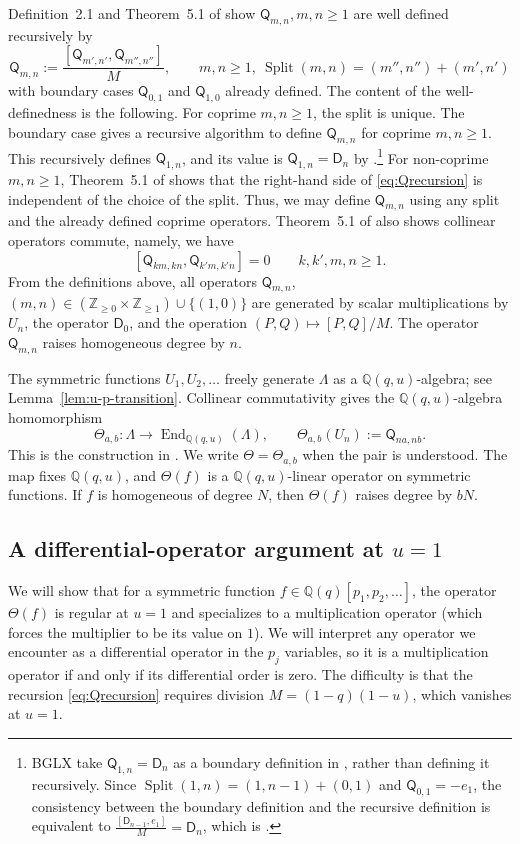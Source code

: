 \documentclass[12pt,reqno]{amsart}
\numberwithin{equation}{section}
\theoremstyle{definition}
\theoremstyle{remark}
\theoremstyle{plain}
\newcommand{\NN}{\mathbb Z_{\ge0}}
\newcommand{\ZZ}{\mathbb Z}
\newcommand{\QQ}{\mathbb Q}
\newcommand{\Qop}{\mathsf Q}
\newcommand{\Dop}{\mathsf D}
\begin{document}
Definition~2.1 and Theorem~5.1 of \cite{BGLX} show $\Qop_{m,n}, m,n\ge 1$ are well defined recursively by
\begin{equation}\label{eq:Qrecursion}
 \Qop_{m,n}:=\frac{[\Qop_{m',n'},\Qop_{m'',n''}]}{M}
       , \qquad m,n\ge 1,\ \operatorname{Split}(m,n)=(m'',n'')+(m',n')
\end{equation}
with boundary cases $\Qop_{0,1}$ and $\Qop_{1,0}$ already defined. The content of the well-definedness is the following. For coprime $m,n\ge 1$, the split is unique. The boundary case gives a recursive algorithm to define $\Qop_{m,n}$ for coprime $m,n\geq 1$. This recursively defines $\Qop_{1,n}$, and its value is $\Qop_{1,n}=\Dop_n$ by \cite[(4.9)(ii)]{BGLX}.\footnote{BGLX take $\Qop_{1,n}=\Dop_n$ as a boundary definition in \cite[(2.5) and Definition~2.1]{BGLX}, rather than defining it recursively. Since $\operatorname{Split}(1,n)=(1,n-1)+(0,1)$ and $\Qop_{0,1}=-e_1$, the consistency between the boundary definition and the recursive definition is equivalent to $\frac{[\Dop_{n-1},e_1]}{M}=\Dop_n$, which is \cite[(4.9)(ii)]{BGLX}.} For non-coprime $m,n\ge 1$, Theorem~5.1 of \cite{BGLX} shows that the right-hand side of \eqref{eq:Qrecursion} is independent of the choice of the split. Thus, we may define $\Qop_{m,n}$ using any split and the already defined coprime operators. Theorem~5.1 of \cite{BGLX} also shows collinear operators commute, namely, we have
\[
 [\Qop_{km,kn},\Qop_{k'm,k'n}]=0\qquad k,k',m,n\ge1.
\]
From the definitions above, all operators $\Qop_{m,n}$, $(m,n)\in (\NN\times \ZZ_{\ge 1})\cup \{(1,0)\}$ are generated by scalar multiplications by $U_n$, the operator $\Dop_0$, and the operation $(P,Q)\mapsto [P,Q]/M$. The operator $\Qop_{m,n}$ raises homogeneous degree by $n$.


The symmetric functions $U_1,U_2,\dots$ freely generate
$\Lambda$ as a $\QQ(q,u)$-algebra; see Lemma~\ref{lem:u-p-transition}.  Collinear commutativity gives the $\QQ(q,u)$-algebra homomorphism
\[
 \Theta_{a,b}:\Lambda\longrightarrow
       \operatorname{End}_{\QQ(q,u)}(\Lambda),\qquad
 \Theta_{a,b}(U_n):=\Qop_{na,nb}.
\]
This is the construction in \cite[Algorithm~3.1]{BGLX}.
We write $\Theta=\Theta_{a,b}$ when the pair is understood.
The map fixes $\QQ(q,u)$, and $\Theta(f)$ is a
$\QQ(q,u)$-linear operator on symmetric functions.  If $f$ is
homogeneous of degree $N$, then $\Theta(f)$ raises degree by $bN$.



\subsection{A differential-operator argument at \texorpdfstring{$u=1$}{u=1}}\label{sec:rees}
We will show that for a symmetric function $f\in \QQ(q)[p_1,p_2,\dots]$, the operator $\Theta(f)$ is regular at $u=1$ and specializes to a
multiplication operator (which forces the multiplier to be its value on $1$). We will interpret any operator we encounter as a differential operator in the $p_j$ variables, so it is a multiplication operator if and only if its differential order is zero. The difficulty is that the recursion \eqref{eq:Qrecursion} requires division
$M=(1-q)(1-u)$, which vanishes at $u=1$.
\end{document}
